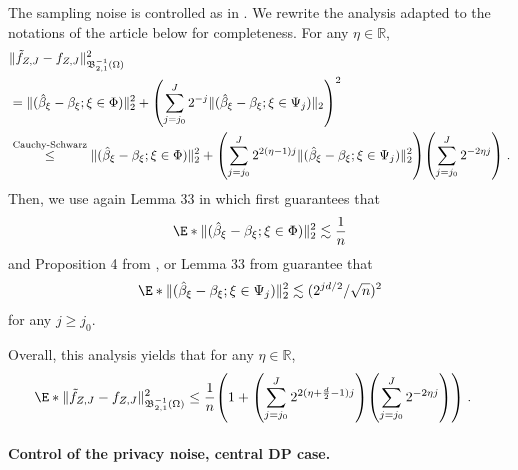 \documentclass{article}
\newcommand{\R}{\mathbb{R}}
\newcommand{\1}{\mathds{1}}
\DeclarePairedDelimiter{\paren}{\lparen}{\rparen}
\theoremstyle{plain}
\theoremstyle{definition}
\theoremstyle{remark}
\begin{document}
The sampling noise is controlled as in \cite{Manole2024Plugin}. We rewrite the analysis adapted to the notations of the article below for completeness. 
For any $\eta \in \R$,
\begin{equation}
\begin{aligned}
    &\| \tilde{f}_{Z, J} - {f}_{Z,J}\|_{{\mathfrak{B}}_{2, 1}^{-1}(\Omega)}^2 \\
    &= \| (\hat{\beta}_{\xi} - {\beta}_{\xi};  \xi \in \Phi) \|_2^2
    + \paren*{\sum_{j = j_0}^J 2^{-j} \|(\hat{\beta}_{\xi} - {\beta}_{\xi};  \xi \in \Psi_j) \|_{2}}^2 \\
    &\overset{\text{Cauchy-Schwarz}}{\leq }
    \| (\hat{\beta}_{\xi} - {\beta}_{\xi};  \xi \in \Phi) \|_2^2
    + \paren*{\sum_{j = j_0}^J 2^{2 (\eta - 1)j} \|(\hat{\beta}_{\xi} - {\beta}_{\xi};  \xi \in \Psi_j) \|_{2}^2}
    \paren*{\sum_{j = j_0}^J 2^{-2 \eta j} } \;.
\end{aligned}
\end{equation}
Then, we use again Lemma 33 in \cite{Manole2024Plugin} which first guarantees that
\begin{equation}
    \E*{\| (\hat{\beta}_{\xi} - {\beta}_{\xi};  \xi \in \Phi) \|_2^2 }
    \lesssim
    \frac{1}{n}
\end{equation}
and Proposition 4 from \cite{NilesWeed2019Minimax}, or Lemma 33 from \cite{Manole2024Plugin} guarantee that  
\begin{equation}
    \E*{\|(\hat{\beta}_{\xi} - {\beta}_{\xi};  \xi \in \Psi_j) \|_{2}^2 }
    \lesssim
    (2^{j d /2} / \sqrt{n})^2
\end{equation}
for any $j \geq j_0$.

Overall, this analysis yields that for any $\eta \in \R$,
\begin{equation}
\begin{aligned}
    \E*{\| \tilde{f}_{Z, J} - {f}_{Z,J}\|_{{\mathfrak{B}}_{2, 1}^{-1}(\Omega)}^2 }
    &\overset{}{\leq }
    \frac{1}{n} \paren*{1 + \paren*{\sum_{j = j_0}^J 2^{2 (\eta +\frac{d}{2} - 1)j} }
    \paren*{\sum_{j = j_0}^J 2^{-2 \eta j} } }\;.
\end{aligned}
\end{equation}



\paragraph{Control of the privacy noise, central DP case.}
\end{document}
